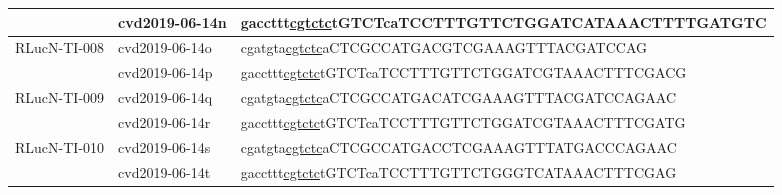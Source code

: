 \begin{table}[]
{\begin{tabular}{|l|l|l|}
			& cvd2019-06-14n & gaccttt\underline{cgtctc}tGTCTcaTCCTTTGTTCTGGATCATAAACTTTTGATGTC \\ \hline
			\multirow{2}{*}{RLucN-TI-008} & cvd2019-06-14o & cgatgta\underline{cgtctc}aCTCGCCATGACGTCGAAAGTTTACGATCCAG        \\ \cline{2-3} 
			& cvd2019-06-14p & gaccttt\underline{cgtctc}tGTCTcaTCCTTTGTTCTGGATCGTAAACTTTCGACG   \\ \hline
			\multirow{2}{*}{RLucN-TI-009} & cvd2019-06-14q & cgatgta\underline{cgtctc}aCTCGCCATGACATCGAAAGTTTACGATCCAGAAC     \\ \cline{2-3} 
			& cvd2019-06-14r & gaccttt\underline{cgtctc}tGTCTcaTCCTTTGTTCTGGATCGTAAACTTTCGATG   \\ \hline
			\multirow{2}{*}{RLucN-TI-010} & cvd2019-06-14s & cgatgta\underline{cgtctc}aCTCGCCATGACCTCGAAAGTTTATGACCCAGAAC     \\ \cline{2-3} 
			& cvd2019-06-14t & gaccttt\underline{cgtctc}tGTCTcaTCCTTTGTTCTGGGTCATAAACTTTCGAG    \\ \hline
		\end{tabular}%
	}
\end{table}


